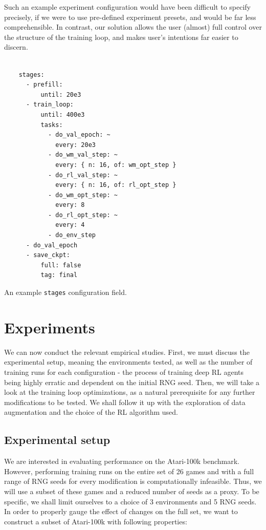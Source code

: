 \documentclass[en]{pracamgr}
\begin{document}
Such an example experiment configuration would have been difficult to specify precisely, if we were to use pre-defined experiment presets, and would be far less comprehensible. In contrast, our solution allows the user (almost) full control over the structure of the training loop, and makes user's intentions far easier to discern.

\begin{listing}
  \begin{verbatim}

    stages:
      - prefill:
          until: 20e3
      - train_loop:
          until: 400e3
          tasks:
            - do_val_epoch: ~
              every: 20e3
            - do_wm_val_step: ~
              every: { n: 16, of: wm_opt_step }
            - do_rl_val_step: ~
              every: { n: 16, of: rl_opt_step }
            - do_wm_opt_step: ~
              every: 8
            - do_rl_opt_step: ~
              every: 4
            - do_env_step
      - do_val_epoch
      - save_ckpt:
          full: false
          tag: final
  \end{verbatim}
  \caption{An example {\tt stages} configuration field.}
  \label{lst:recipe_conf}
\end{listing}

\chapter{Experiments}

We can now conduct the relevant empirical studies. First, we must discuss the experimental setup, meaning the environments tested, as well as the number of training runs for each configuration - the process of training deep RL agents being highly erratic and dependent on the initial RNG seed. Then, we will take a look at the training loop optimizations, as a natural prerequisite for any further modifications to be tested. We shall follow it up with the exploration of data augmentation and the choice of the RL algorithm used.

\section{Experimental setup}

We are interested in evaluating performance on the Atari-100k benchmark. However, performing training runs on the entire set of 26 games and with a full range of RNG seeds for every modification is computationally infeasible. Thus, we will use a subset of these games and a reduced number of seeds as a proxy. To be specific, we shall limit ourselves to a choice of 3 environments and 5 RNG seeds. In order to properly gauge the effect of changes on the full set, we want to construct a subset of Atari-100k with following properties:
\end{document}
